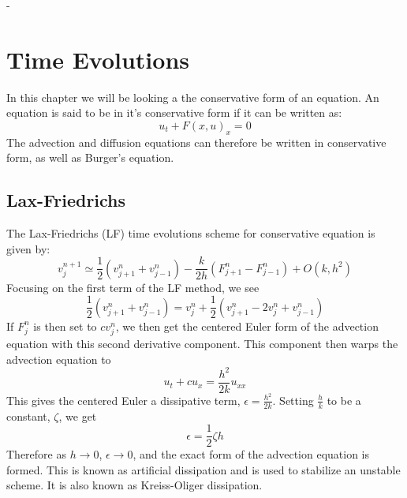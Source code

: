 -\chapter{Time Evolutions}
In this chapter we will be looking a the conservative form of an equation. An equation is said to be in it's conservative form if it can be written as:
\begin{equation} \label{eq:conf}
  u_t + F(x,u)_x = 0
\end{equation}
The advection and diffusion equations can therefore be written in conservative form, as well as Burger's equation.
\section{Lax-Friedrichs}
The Lax-Friedrichs (LF) time evolutions scheme for conservative equation is given by:
\begin{equation*}
  v^{n+1}_j \simeq \frac{1}{2}(v^n_{j+1} + v^n_{j-1}) - \frac{k}{2h}(F^n_{j+1}-F^n_{j-1}) + O(k,h^2)
\end{equation*}
Focusing on the first term of the LF method, we see
\begin{equation*}
  \frac{1}{2}(v^n_{j+1} + v^n_{j-1}) = v^n_j + \frac{1}{2}(v^n_{j+1} - 2v^n_j + v^n_{j-1})
\end{equation*}
If $F^n_j$ is then set to $cv^n_j$, we then get the centered Euler form of the advection equation with this second derivative component. This component then warps the advection equation to
\begin{equation*}
 u_t + cu_x = \frac{h^2}{2k}u_{xx}
\end{equation*}
This gives the centered Euler a dissipative term, $\epsilon = \frac{h^2}{2k}$. Setting $\frac{h}{k}$ to be a constant, $\zeta$, we get
\begin{equation*}
  \epsilon = \frac{1}{2}\zeta h
\end{equation*}
Therefore as $h\rightarrow 0$, $\epsilon\rightarrow0$, and the exact form of the advection equation is formed. This is known as artificial dissipation and is used to stabilize an unstable scheme. It is also known as Kreiss-Oliger dissipation.

